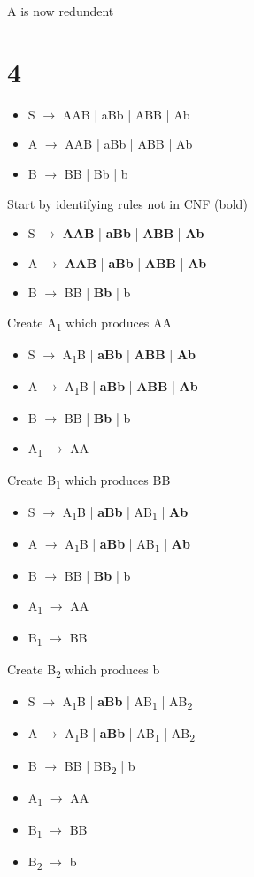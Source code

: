 \documentclass[11pt]{article}
\begin{document}
A is now redundent
\section{4}
\label{sec:org6d10d38}
\begin{itemize}
\item S \(\rightarrow\) AAB | aBb | ABB | Ab
\item A \(\rightarrow\) AAB | aBb | ABB | Ab
\item B \(\rightarrow\) BB | Bb | b
\end{itemize}

Start by identifying rules not in CNF (bold)
\begin{itemize}
\item S \(\rightarrow\) \textbf{AAB} | \textbf{aBb} | \textbf{ABB} | \textbf{Ab}
\item A \(\rightarrow\) \textbf{AAB} | \textbf{aBb} | \textbf{ABB} | \textbf{Ab}
\item B \(\rightarrow\) BB | \textbf{Bb} | b
\end{itemize}

Create A\textsubscript{1} which produces AA
\begin{itemize}
\item S \(\rightarrow\) A\textsubscript{1}B | \textbf{aBb} | \textbf{ABB} | \textbf{Ab}
\item A \(\rightarrow\) A\textsubscript{1}B | \textbf{aBb} | \textbf{ABB} | \textbf{Ab}
\item B \(\rightarrow\) BB | \textbf{Bb} | b
\item A\textsubscript{1} \(\rightarrow\) AA
\end{itemize}

Create B\textsubscript{1} which produces BB
\begin{itemize}
\item S \(\rightarrow\) A\textsubscript{1}B | \textbf{aBb} | AB\textsubscript{1} | \textbf{Ab}
\item A \(\rightarrow\) A\textsubscript{1}B | \textbf{aBb} | AB\textsubscript{1} | \textbf{Ab}
\item B \(\rightarrow\) BB | \textbf{Bb} | b
\item A\textsubscript{1} \(\rightarrow\) AA
\item B\textsubscript{1} \(\rightarrow\) BB
\end{itemize}

Create B\textsubscript{2} which produces b
\begin{itemize}
\item S \(\rightarrow\) A\textsubscript{1}B | \textbf{aBb} | AB\textsubscript{1} | AB\textsubscript{2}
\item A \(\rightarrow\) A\textsubscript{1}B | \textbf{aBb} | AB\textsubscript{1} | AB\textsubscript{2}
\item B \(\rightarrow\) BB | BB\textsubscript{2} | b
\item A\textsubscript{1} \(\rightarrow\) AA
\item B\textsubscript{1} \(\rightarrow\) BB
\item B\textsubscript{2} \(\rightarrow\) b
\end{itemize}
\end{document}
